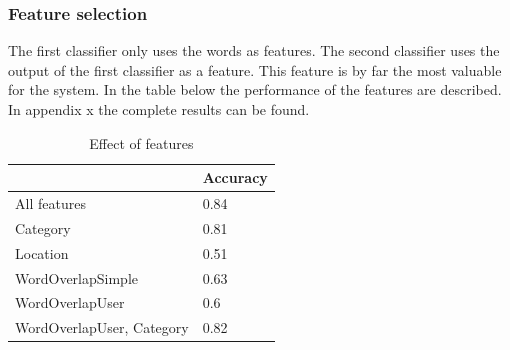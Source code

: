 \documentclass[
10pt, %
a4paper, %
oneside, %
headinclude,footinclude, %
BCOR5mm, %
]{scrartcl}
\begin{document}
\subsubsection{Feature selection}
The first classifier only uses the words as features. The second classifier uses the output of the first classifier as a feature. This feature is by far the most valuable for the system. In the table below the performance of the features are described. In appendix x the complete results can be found.


\begin{table}[h]
\begin{tabular}{|l|l|}
\hline
                          & Accuracy \\ \hline
All features              & 0.84     \\ \hline
Category                  & 0.81     \\ \hline
Location                  & 0.51     \\ \hline
WordOverlapSimple         & 0.63     \\ \hline
WordOverlapUser           & 0.6      \\ \hline
WordOverlapUser, Category & 0.82     \\ \hline
\end{tabular}
\caption[Table caption text]{Effect of features  }
\end{table}
\end{document}
